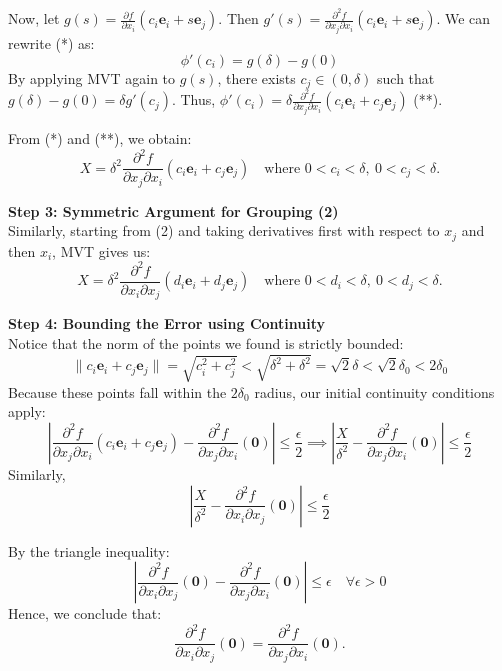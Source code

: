 \begin{pfbox}
Now, let $g(s) = \frac{\partial f}{\partial x_i}(c_i \mathbf{e}_i + s \mathbf{e}_j)$. Then $g'(s) = \frac{\partial^2 f}{\partial x_j \partial x_i}(c_i \mathbf{e}_i + s \mathbf{e}_j)$.
We can rewrite (*) as:
$$ \phi'(c_i) = g(\delta) - g(0) $$
By applying MVT again to $g(s)$, there exists $c_j \in (0, \delta)$ such that $g(\delta) - g(0) = \delta g'(c_j)$.
Thus, $\phi'(c_i) = \delta \frac{\partial^2 f}{\partial x_j \partial x_i}(c_i \mathbf{e}_i + c_j \mathbf{e}_j)$ \quad (**).

From (*) and (**), we obtain:
$$ X = \delta^2 \frac{\partial^2 f}{\partial x_j \partial x_i}(c_i \mathbf{e}_i + c_j \mathbf{e}_j) \quad \text{where } 0 < c_i < \delta, \ 0 < c_j < \delta. $$

\vspace{0.8em}
\noindent \textbf{Step 3: Symmetric Argument for Grouping (2)}\\
Similarly, starting from (2) and taking derivatives first with respect to $x_j$ and then $x_i$, MVT gives us:
$$ X = \delta^2 \frac{\partial^2 f}{\partial x_i \partial x_j}(d_i \mathbf{e}_i + d_j \mathbf{e}_j) \quad \text{where } 0 < d_i < \delta, \ 0 < d_j < \delta. $$

\vspace{0.8em}
\noindent \textbf{Step 4: Bounding the Error using Continuity}\\
Notice that the norm of the points we found is strictly bounded:
$$ \|c_i \mathbf{e}_i + c_j \mathbf{e}_j\| = \sqrt{c_i^2 + c_j^2} < \sqrt{\delta^2 + \delta^2} = \sqrt{2}\delta < \sqrt{2}\delta_0 < 2\delta_0 $$
Because these points fall within the $2\delta_0$ radius, our initial continuity conditions apply:
$$ \left| \frac{\partial^2 f}{\partial x_j \partial x_i}(c_i \mathbf{e}_i + c_j \mathbf{e}_j) - \frac{\partial^2 f}{\partial x_j \partial x_i}(\mathbf{0}) \right| \le \frac{\epsilon}{2} \implies \left| \frac{X}{\delta^2} - \frac{\partial^2 f}{\partial x_j \partial x_i}(\mathbf{0}) \right| \le  \frac{\epsilon}{2} $$
Similarly,
$$ \left| \frac{X}{\delta^2} - \frac{\partial^2 f}{\partial x_i \partial x_j}(\mathbf{0}) \right| \le  \frac{\epsilon}{2} $$

By the triangle inequality:
$$ \left| \frac{\partial^2 f}{\partial x_i \partial x_j}(\mathbf{0}) - \frac{\partial^2 f}{\partial x_j \partial x_i}(\mathbf{0}) \right| \le \epsilon \quad \forall \epsilon > 0 $$
Hence, we conclude that:
$$ \frac{\partial^2 f}{\partial x_i \partial x_j}(\mathbf{0}) = \frac{\partial^2 f}{\partial x_j \partial x_i}(\mathbf{0}). $$

\end{pfbox}

